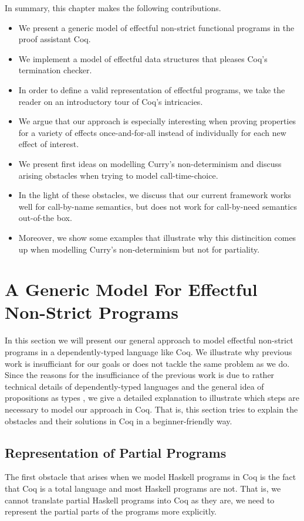 In summary, this chapter makes the following contributions.

\begin{itemize}
\item We present a generic model of effectful non-strict functional programs in the proof assistant Coq.
\item We implement a model of effectful data structures that pleases Coq's termination checker.
\item In order to define a valid representation of effectful programs, we take the reader on an introductory tour of Coq's intricacies.
\item We argue that our approach is especially interesting when proving properties for a variety of effects once-and-for-all instead of individually for each new effect of interest.
\item We present first ideas on modelling Curry's non-determinism and discuss arising obstacles when trying to model call-time-choice.
\item In the light of these obstacles, we discuss that our current framework works well for call-by-name semantics, but does not work for call-by-need semantics out-of-the box.
\item Moreover, we show some examples that illustrate why this distincition comes up when modelling Curry's non-determinism but not for partiality.
\end{itemize}
 
\section{A Generic Model For Effectful Non-Strict Programs}

In this section we will present our general approach to model effectful non-strict programs in a dependently-typed language like Coq.
We illustrate why previous work is insufficiant for our goals or does not tackle the same problem as we do.
Since the reasons for the insufficiance of the previous work is due to rather technical details of dependently-typed languages and the general idea of propositions as types \citep{wadler2015propositions}, we give a detailed explanation to illustrate which steps are necessary to model our approach in Coq.
That is, this section tries to explain the obstacles and their solutions in Coq in a beginner-friendly way.

\subsection{Representation of Partial Programs}
\label{subsec:partial}
The first obstacle that arises when we model Haskell programs in Coq is the fact that Coq is a total language and most Haskell programs are not.
That is, we cannot translate partial Haskell programs into Coq as they are, we need to represent the partial parts of the programs more explicitly.

